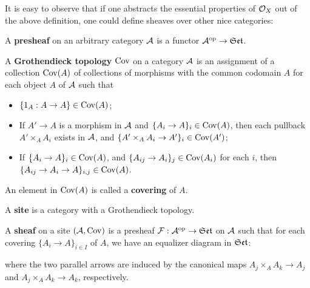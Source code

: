 It is easy to observe that if one abstracts the essential properties of $\mathcal{O}_X$ out of the above definition,
one could define sheaves over other nice categories:

\begin{definition}
  A \textbf{presheaf} on an arbitrary category $\mathcal{A}$ is a functor%
  \linebreak $\mathcal{A}^{\mathrm{op}} \to \mathfrak{Set}$.

  A \textbf{Grothendieck topology} $\mathrm{Cov}$ on a category $\mathcal{A}$ is an assignment of a collection $\mathrm{Cov}(A)$ of collections of morphisms with the common codomain $A$ for each object $A$ of $\mathcal{A}$ such that
  \begin{itemize}
    \item[*] $\{1_A:A \to A\} \in \mathrm{Cov}(A)$;
    \item[*] If $A' \to A$ is a morphism in $\mathcal{A}$ and $\{A_i \to A\}_i \in \mathrm{Cov}(A)$,
    then each pullback $A' \times_A A_i$ exists in $\mathcal{A}$,
    and $\{A' \times_A A_i \to A'\}_i \in \mathrm{Cov}(A')$;
    \item[*] If $\{A_i \to A\}_i \in \mathrm{Cov}(A)$,
    and $\{A_{ij} \to A_i\}_j \in \mathrm{Cov}(A_i)$ for each $i$,
    then $\{A_{ij} \to A_i \to A\}_{i,j} \in \mathrm{Cov}(A)$.
  \end{itemize}
  An element in $\mathrm{Cov}(A)$ is called a \textbf{covering} of $A$.

  A \textbf{site} is a category with a Grothendieck topology.

  A \textbf{sheaf} on a site $(\mathcal{A},\mathrm{Cov})$ is a presheaf $\mathcal{F}:\mathcal{A}^{\mathrm{op}} \to \mathfrak{Set}$ on $\mathcal{A}$ such that for each covering $\{A_i \to A\}_{i \in I}$ of $A$,
  we have an equalizer diagram in $\mathfrak{Set}$:
  \begin{center}
  \end{center}
  where the two parallel arrows are induced by the canonical maps $A_j \times_A A_k \to A_j$ and $A_j \times_A A_k \to A_k$,
  respectively.
\end{definition}

